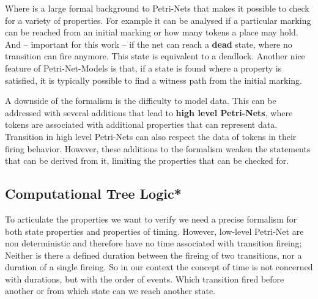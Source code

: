 Where is a large formal background to Petri-Nets that makes it possible to check for a variety of properties.
For example it can be analysed if a particular marking can be reached from an initial marking or how many tokens a place may hold.
And -- important for this work -- if the net can reach a \textbf{dead} state, where no transition can fire anymore.
This state is equivalent to a deadlock.
Another nice feature of Petri-Net-Models is that, if a state is found where a property is satisfied, it is typically possible to find a witness path from the initial marking.

A downside of the formalism is the difficulty to model data.
This can be addressed with several additions that lead to \textbf{high level Petri-Nets}, where tokens are associated with additional properties that can represent data.
Transition in high level Petri-Nets can also respect the data of tokens in their firing behavior.
However, these additions to the formalism weaken the statements that can be derived from it, limiting the properties that can be checked for.

\subsection{Computational Tree Logic*}
\label{rel_ctl}
To articulate the properties we want to verify we need a precise formalism for both state properties and properties of timing.
However, low-level Petri-Net are non deterministic and therefore have no time associated with transition fireing;
Neither is there a defined duration between the fireing of two transitions, nor a duration of a single fireing.
So in our context the concept of time is not concerned with durations, but with the order of events.
Which transition fired before another or from which state can we reach another state.

